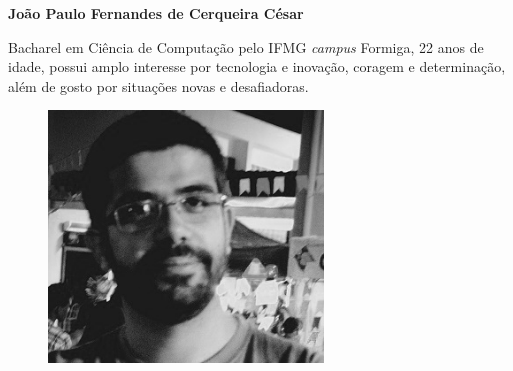 			
		\begin{minipage}{0.6\textwidth}
			
			\textbf{João Paulo Fernandes de Cerqueira César}
			
			Bacharel em Ciência de Computação pelo IFMG \textit{campus} Formiga, 22 anos de idade, possui amplo interesse por tecnologia e inovação, coragem e determinação, além de gosto por situações novas e desafiadoras.
				
			
		\end{minipage}
		\begin{minipage}{0.4\textwidth}
			
			\begin{figure}[H]
				\centering
				\includegraphics[width=0.65\textwidth]{img/jp2pb.jpg}
			\end{figure}
			
		\end{minipage}
		
		
		
